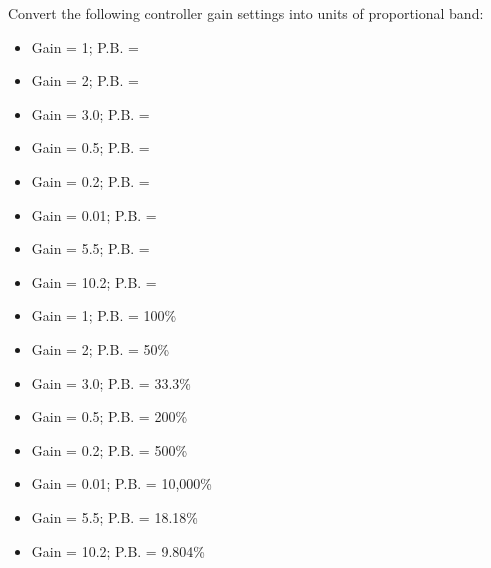 

Convert the following controller gain settings into units of proportional band:

\begin{itemize}
\item{}Gain = 1; P.B. = \underbar{\hskip 50pt}
\vskip 5pt
\item{}Gain = 2; P.B. = \underbar{\hskip 50pt} 
\vskip 5pt
\item{}Gain = 3.0; P.B. = \underbar{\hskip 50pt} 
\vskip 5pt
\item{}Gain = 0.5; P.B. = \underbar{\hskip 50pt}
\vskip 5pt
\item{}Gain = 0.2; P.B. = \underbar{\hskip 50pt} 
\vskip 5pt
\item{}Gain = 0.01; P.B. = \underbar{\hskip 50pt} 
\vskip 5pt
\item{}Gain = 5.5; P.B. = \underbar{\hskip 50pt} 
\vskip 5pt
\item{}Gain = 10.2; P.B. = \underbar{\hskip 50pt} 
\end{itemize} 







\begin{itemize}
\item{}Gain = 1; P.B. = 100\%
\vskip 5pt
\item{}Gain = 2; P.B. = 50\%
\vskip 5pt
\item{}Gain = 3.0; P.B. = 33.3\%
\vskip 5pt
\item{}Gain = 0.5; P.B. = 200\%
\vskip 5pt
\item{}Gain = 0.2; P.B. = 500\%
\vskip 5pt
\item{}Gain = 0.01; P.B. = 10,000\%
\vskip 5pt
\item{}Gain = 5.5; P.B. = 18.18\%
\vskip 5pt
\item{}Gain = 10.2; P.B. = 9.804\%
\end{itemize} 












